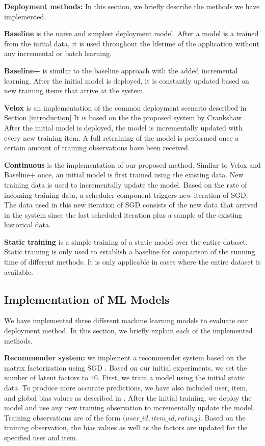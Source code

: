 \documentclass{vldb}
\begin{document}
\textbf{Deployment methods:} In this section, we briefly describe the methods we have implemented.

\textbf{Baseline} is the naive and simplest deployment model. 
After a model is a trained from the initial data, it is used throughout the lifetime of the application without any incremental or batch learning.

\textbf{Baseline+} is similar to the baseline approach with the added incremental learning.
After the initial model is deployed, it is constantly updated based on new training items that arrive at the system.

\textbf{Velox} is an implementation of the common deployment scenario described in Section \ref{introduction}
It is based on the the proposed system by Crankshaw \cite{crankshaw2014missing}. 
After the initial model is deployed, the model is incrementally updated with every new training item.
A full retraining of the model is performed once a certain amount of training observations have been received.

\textbf{Continuous} is the implementation of our proposed method. 
Similar to Velox and Baseline+ once, an initial model is first trained using the existing data.
New training data is used to incrementally update the model.
Based on the rate of incoming training data, a scheduler component triggers new iteration of SGD.
The data used in this new iteration of SGD consists of the new data that arrived in the system since the last scheduled iteration plus a sample of the existing historical data.

\textbf{Static training} is a simple training of a static model over the entire dataset. 
Static training is only used to establish a baseline for comparison of the running time of different methods.
It is only applicable in cases where the entire dataset is available.

\subsection{Implementation of ML Models}
We have implemented three different machine learning models to evaluate our deployment method.
In this section, we briefly explain each of the implemented methods.

\textbf{Recommender system:} we implement a recommender system based on the matrix factorization using SGD \cite{funk2006netflix}.
Based on our initial experiments, we set the number of latent factors to 40.
First, we train a model using the initial static data.
To produce more accurate predictions, we have also included user, item, and global bias values as described in \cite{koren2009matrix}.
After the initial training, we deploy the model and use any new training observation to incrementally update the model.
Training observations are of the form \textit{\((user\_id, item\_id, rating\))}.
Based on the training observation, the bias values as well as the factors are updated for the specified user and item.
\end{document}

